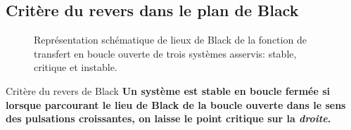 \subsection{Critère du revers dans le plan de Black
}
\acpl
\begin{figure}[!h]
    \centering
    
    \caption{Représentation schématique de lieux de Black de la 
             fonction de transfert en boucle ouverte de trois systèmes 
             asservis: stable, critique et instable.
             \label{fig-black_revers}}
\end{figure}
\begin{criteria}{Critère du revers de Black}
\textbf{Un système est stable en boucle fermée si lorsque parcourant 
        le lieu de Black de la boucle ouverte dans le sens des 
        pulsations croissantes, on laisse le point critique sur 
        la \emph{droite}.}
\end{criteria}
